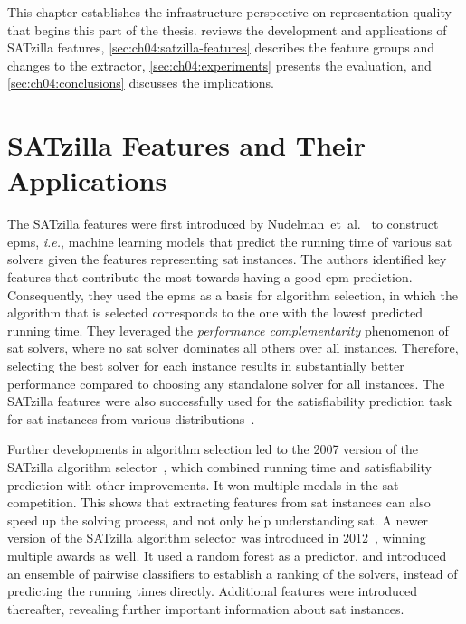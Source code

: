 This chapter establishes the infrastructure perspective on representation quality that begins this part of the thesis.  reviews the development and applications of SATzilla features, \cref{sec:ch04:satzilla-features} describes the feature groups and changes to the extractor, \cref{sec:ch04:experiments} presents the evaluation, and \cref{sec:ch04:conclusions} discusses the implications.

\section{SATzilla Features and Their Applications}
\label{sec:ch04:satzilla-applications}

The SATzilla features were first introduced by Nudelman~et~al.~\cite{NudEtAl04} to construct \glspl{epm}, \emph{i.e.}, machine learning models that predict the running time of various \gls{sat} solvers given the features representing \gls{sat} instances. The authors identified key features that contribute the most towards having a good \gls{epm} prediction.
Consequently, they used the \glspl{epm} as a basis for algorithm selection, in which the algorithm that is selected corresponds to the one with the lowest predicted running time.
They leveraged the \textit{performance complementarity} phenomenon of \gls{sat} solvers, where no \gls{sat} solver dominates all others over all instances.
Therefore, selecting the best solver for each instance results in substantially better performance compared to choosing any standalone solver for all instances.
The SATzilla features were also successfully used for the satisfiability prediction task for \gls{sat} instances from various distributions~\cite{DevOSu08}.

Further developments in algorithm selection led to the 2007 version of the SATzilla algorithm selector~\cite{XuEtAl08}, which combined running time and satisfiability prediction with other improvements. It won multiple medals in the \gls{sat} competition. This shows that extracting features from \gls{sat} instances can also speed up the solving process, and not only help understanding \gls{sat}. A newer version of the SATzilla algorithm selector was introduced in 2012~\cite{XuEtAl12}, winning multiple awards as well. It used a random forest as a predictor, and introduced an ensemble of pairwise classifiers to establish a ranking of the solvers, instead of predicting the running times directly. Additional features were introduced thereafter, revealing further important information about \gls{sat} instances.

